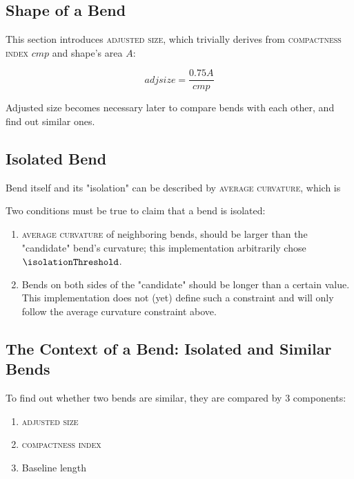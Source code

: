 \documentclass[a4paper]{article}
\begin{document}
\subsection{Shape of a Bend}

This section introduces \textsc{adjusted size}, which trivially derives from
\textsc{compactness index} $cmp$ and shape's area $A$:

\[
    adjsize = \frac{0.75 A}{cmp}
\]

Adjusted size becomes necessary later to compare bends with each other, and
find out similar ones.

\subsection{Isolated Bend}

Bend itself and its "isolation" can be described by \textsc{average curvature},
which is 

Two conditions must be true to claim that a bend is isolated:

\begin{enumerate}
    \item \textsc{average curvature} of neighboring bends, should be larger
        than the "candidate" bend's curvature; this implementation arbitrarily
        chose $\isolationThreshold$.

    \item Bends on both sides of the "candidate" should be longer than a
        certain value. This implementation does not (yet) define such a
        constraint and will only follow the average curvature constraint above.
\end{enumerate}

\subsection{The Context of a Bend: Isolated and Similar Bends}

To find out whether two bends are similar, they are compared by 3 components:

\begin{enumerate}
    \item \textsc{adjusted size}
    \item \textsc{compactness index}
    \item Baseline length
\end{enumerate}
\end{document}
